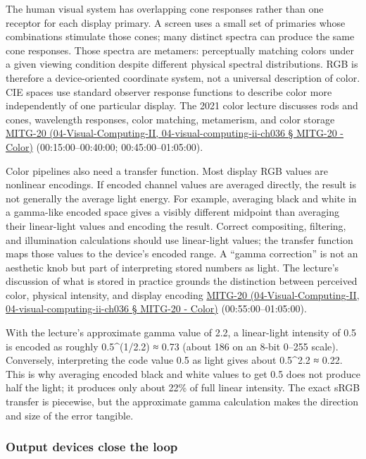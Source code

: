 The human visual system has overlapping cone responses rather than one receptor for each display primary. A screen uses a small set of primaries whose combinations stimulate those cones; many distinct spectra can produce the same cone responses. Those spectra are metamers: perceptually matching colors under a given viewing condition despite different physical spectral distributions. RGB is therefore a device-oriented coordinate system, not a universal description of color. CIE spaces use standard observer response functions to describe color more independently of one particular display. The 2021 color lecture discusses rods and cones, wavelength responses, color matching, metamerism, and color storage \href{}{MITG-20 (04-Visual-Computing-II, 04-visual-computing-ii-ch036 § MITG-20 - Color)} (00:15:00--00:40:00; 00:45:00--01:05:00).

Color pipelines also need a transfer function. Most display RGB values are nonlinear encodings. If encoded channel values are averaged directly, the result is not generally the average light energy. For example, averaging black and white in a gamma-like encoded space gives a visibly different midpoint than averaging their linear-light values and encoding the result. Correct compositing, filtering, and illumination calculations should use linear-light values; the transfer function maps those values to the device's encoded range. A ``gamma correction'' is not an aesthetic knob but part of interpreting stored numbers as light. The lecture's discussion of what is stored in practice grounds the distinction between perceived color, physical intensity, and display encoding \href{}{MITG-20 (04-Visual-Computing-II, 04-visual-computing-ii-ch036 § MITG-20 - Color)} (00:55:00--01:05:00).

With the lecture's approximate gamma value of 2.2, a linear-light intensity of 0.5 is encoded as roughly 0.5\^{}(1/2.2) ≈ 0.73 (about 186 on an 8-bit 0--255 scale). Conversely, interpreting the code value 0.5 as light gives about 0.5\^{}2.2 ≈ 0.22. This is why averaging encoded black and white values to get 0.5 does not produce half the light; it produces only about 22\% of full linear intensity. The exact sRGB transfer is piecewise, but the approximate gamma calculation makes the direction and size of the error tangible.

\subsubsection{Output devices close the loop}\label{output-devices-close-the-loop}

